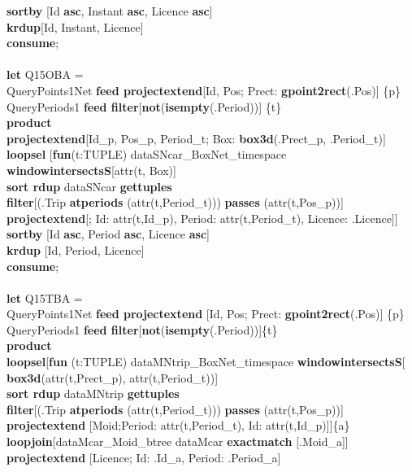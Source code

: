\documentclass[a4paper]{article}
\newcommand{\op}[1]{\textbf{#1}}
\begin{document}
\begin{scriptsize}
\begin{tabbing}
\>\op{sortby} [Id \op{asc}, Instant \op{asc}, Licence \op{asc}]\\
\>\op{krdup}[Id, Instant, Licence]\\
\op{consume};\\
\\
\op{let} Q15OBA =\\
\>QueryPoints1Net \op{feed projectextend}[Id, Pos; Prect:
\op{gpoint2rect}(.Pos)] \{p\}\\
\>QueryPeriods1 \op{feed filter}[\op{not}(\op{isempty}(.Period))] \{t\}\\
\>\op{product}\\
\>\op{projectextend}[Id\_p, Pos\_p, Period\_t; Box: \op{box3d}(.Prect\_p,
.Period\_t)]\\
\>\op{loopsel} [\op{fun}(t:TUPLE) dataSNcar\_BoxNet\_timespace
\op{windowintersectsS}[attr(t, Box)]\\
\>\>\op{sort rdup} dataSNcar \op{gettuples}\\
\>\>\op{filter}[(.Trip \op{atperiods} (attr(t,Period\_t))) \op{passes}
(attr(t,Pos\_p))]\\
\>\>\op{projectextend}[; Id: attr(t,Id\_p), Period: attr(t,Period\_t), Licence:
.Licence]]\\
\>\op{sortby} [Id \op{asc}, Period \op{asc}, Licence \op{asc}]\\
\>\op{krdup} [Id, Period, Licence]\\
\op{consume};\\
\\
\op{let} Q15TBA =\\
\>QueryPoints1Net \op{feed projectextend} [Id, Pos; Prect:
\op{gpoint2rect}(.Pos)] \{p\}\\
\>QueryPeriods1 \op{feed filter}[\op{not}(\op{isempty}(.Period))]\{t\}\\
\>\op{product}\\
\>\op{loopsel}[\op{fun} (t:TUPLE) dataMNtrip\_BoxNet\_timespace
\op{windowintersectsS}[\\
\>\>\>\op{box3d}(attr(t,Prect\_p), attr(t,Period\_t))]\\
\>\>\op{sort rdup} dataMNtrip \op{gettuples}\\
\>\>\op{filter}[(.Trip \op{atperiods} (attr(t,Period\_t))) \op{passes}
(attr(t,Pos\_p))]\\
\>\>\op{projectextend} [Moid;Period: attr(t,Period\_t), Id:
attr(t,Id\_p)]]\{a\}\\
\>\op{loopjoin}[dataMcar\_Moid\_btree dataMcar \op{exactmatch} [.Moid\_a]]\\
\>\op{projectextend} [Licence; Id: .Id\_a, Period: .Period\_a]\\

\end{tabbing}
\end{scriptsize}
\end{document}
